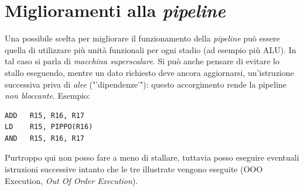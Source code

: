 \section{Miglioramenti alla \textit{pipeline}}
\label{sec:pipelineMiglioramenti}

Una possibile scelta per migliorare il funzionamento della \textit{pipeline} può essere quella di utilizzare più unità funzionali per ogni stadio (ad esempio più ALU). In tal caso si parla di \textit{macchina superscalare}.
Si può anche pensare di evitare lo stallo eseguendo, mentre un dato richiesto deve ancora aggiornarsi, un'istruzione successiva priva di \textit{alee} ("'dipendenze'"): questo accorgimento rende la pipeline\textit{ non bloccante}. 
Esempio:
\begin{verbatim}
ADD   R15, R16, R17
LD    R15, PIPPO(R16)
AND   R15, R16, R17
\end{verbatim}
Purtroppo qui non posso fare a meno di stallare, tuttavia posso eseguire eventuali istruzioni successive intanto che le tre illustrate vengono eseguite (OOO Execution, \textit{Out Of Order Execution}).

